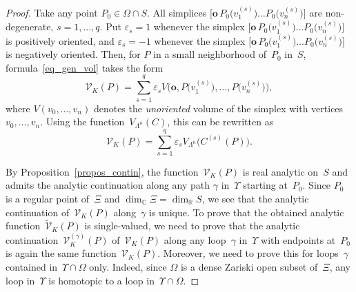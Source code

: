 \documentclass[reqno,tbtags,12pt]{amsart}
\numberwithin{equation}{section}
\newcommand{\R}{\mathbb{R}}
\newcommand{\C}{\mathbb{C}}
\newcommand{\CV}{\mathcal{V}}
\newcommand{\tCV}{\widetilde{\mathcal{V}}}
\newcommand{\bo}{\mathbf{o}}
\theoremstyle{definition}
\begin{document}
\begin{proof}
 
Take any point $ P_0\in \Omega\cap S$. All simplices $\bigl[\bo\, P_0\bigl(v_1^{(s)}\bigr)\ldots  P_0\bigl(v_n^{(s)}\bigr)\bigr]$ are non-deg\-e\-ne\-rate, $s=1,\ldots,q$.  Put $\varepsilon_s=1$ whenever the simplex $\bigl[\bo\, P_0\bigl(v_1^{(s)}\bigr)\ldots  P_0\bigl(v_n^{(s)}\bigr)\bigr]$ is positively oriented, and $\varepsilon_s=-1$ whenever the simplex $\bigl[\bo\, P_0\bigl(v_1^{(s)}\bigr)\ldots  P_0\bigl(v_n^{(s)}\bigr)\bigr]$ is negatively oriented. 
Then, for  $ P$ in a small neighborhood of~$ P_0$ in~$S$, formula~\eqref{eq_gen_vol} takes the form
\begin{equation*}
\CV_K( P)=\sum_{s=1}^q\varepsilon_sV\bigl(\bo, P\bigl(v_1^{(s)}\bigr),\ldots, P\bigl(v_n^{(s)}\bigr)\bigr),
\end{equation*}
where  $V(v_0,\ldots, v_n)$ denotes the \textit{unoriented\/} volume of the simplex with vertices $v_0,\ldots, v_n$. Using the function~$V_{\Lambda^n}(C)$, this can be rewritten as
\begin{equation}\label{eq_decomp}
\CV_K( P)=\sum_{s=1}^q\varepsilon_sV_{\Lambda^n}\bigl(C^{(s)}( P)\bigr).
\end{equation}


By Proposition~\ref{propos_contin}, the function~$\CV_K( P)$ is real analytic on~$S$ and admits the analytic continuation along any path $\gamma$ in~$\Upsilon$ starting at~$P_0$. Since $ P_0$ is a regular point of~$\Xi$ and $\dim_{\C}\Xi=\dim_{\R}S$, we see that the analytic continuation of~$\CV_K( P)$ along~$\gamma$ is unique. To prove that the obtained analytic function~$\tCV_K( P)$ is single-valued, we need to prove that the analytic continuation~$\CV_K^{(\gamma)}( P)$ of~$\CV_K( P)$ along any loop~$\gamma$ in~$\Upsilon$ with endpoints at~$ P_0$ is again the same function~$\CV_K( P)$. Moreover, we need to prove this for loops~$\gamma$ contained in~$\Upsilon\cap\Omega$ only. Indeed, since $\Omega$ is a dense Zariski open subset of~$\Xi$,  any loop in~$\Upsilon$ is homotopic to a loop in~$\Upsilon\cap\Omega$.


\end{proof}
\end{document}
